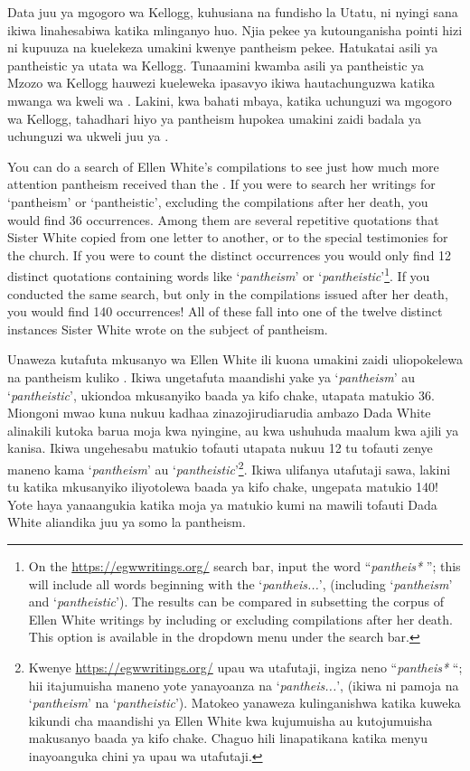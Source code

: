 Data juu ya mgogoro wa Kellogg, kuhusiana na fundisho la Utatu, ni nyingi sana ikiwa  linahesabiwa katika mlinganyo huo. Njia pekee ya kutounganisha pointi hizi ni kupuuza  na kuelekeza umakini kwenye pantheism pekee. Hatukatai asili ya pantheistic ya utata wa Kellogg. Tunaamini kwamba asili ya pantheistic ya Mzozo wa Kellogg hauwezi kueleweka ipasavyo ikiwa hautachunguzwa katika mwanga wa kweli wa . Lakini, kwa bahati mbaya, katika uchunguzi wa mgogoro wa Kellogg, tahadhari hiyo ya pantheism hupokea umakini zaidi badala ya uchunguzi wa ukweli juu ya .


You can do a search of Ellen White’s compilations to see just how much more attention pantheism received than the . If you were to search her writings for ‘pantheism’ or ‘pantheistic’, excluding the compilations after her death, you would find 36 occurrences. Among them are several repetitive quotations that Sister White copied from one letter to another, or to the special testimonies for the church. If you were to count the distinct occurrences you would only find 12 distinct quotations containing words like ‘\textit{pantheism}’ or ‘\textit{pantheistic}’\footnote{On the \href{https://egwwritings.org/}{https://egwwritings.org/} search bar, input the word “\textit{pantheis*} ”; this will include all words beginning with the ‘\textit{pantheis...}’, (including ‘\textit{pantheism}’ and ‘\textit{pantheistic}’). The results can be compared in subsetting the corpus of Ellen White writings by including or excluding compilations after her death. This option is available in the dropdown menu under the search bar.}. If you conducted the same search, but only in the compilations issued after her death, you would find 140 occurrences! All of these fall into one of the twelve distinct instances Sister White wrote on the subject of pantheism.


Unaweza kutafuta mkusanyo wa Ellen White ili kuona umakini zaidi uliopokelewa na pantheism kuliko . Ikiwa ungetafuta maandishi yake ya ‘\textit{pantheism}’ au ‘\textit{pantheistic}’, ukiondoa mkusanyiko baada ya kifo chake, utapata matukio 36. Miongoni mwao kuna nukuu kadhaa zinazojirudiarudia ambazo Dada White alinakili kutoka barua moja kwa nyingine, au kwa ushuhuda maalum kwa ajili ya kanisa. Ikiwa ungehesabu matukio tofauti utapata nukuu 12 tu tofauti zenye maneno kama ‘\textit{pantheism}’ au ‘\textit{pantheistic}’\footnote{Kwenye \href{https://egwwritings.org/}{https://egwwritings.org/} upau wa utafutaji, ingiza neno “\textit{pantheis*} “; hii itajumuisha maneno yote yanayoanza na ‘\textit{pantheis...}’, (ikiwa ni pamoja na ‘\textit{pantheism}’ na ‘\textit{pantheistic}’). Matokeo yanaweza kulinganishwa katika kuweka kikundi cha maandishi ya Ellen White kwa kujumuisha au kutojumuisha makusanyo baada ya kifo chake. Chaguo hili linapatikana katika menyu inayoanguka chini ya upau wa utafutaji.}. Ikiwa ulifanya utafutaji sawa, lakini tu katika mkusanyiko iliyotolewa baada ya kifo chake, ungepata matukio 140! Yote haya yanaangukia katika moja ya matukio kumi na mawili tofauti Dada White aliandika juu ya somo la pantheism.


